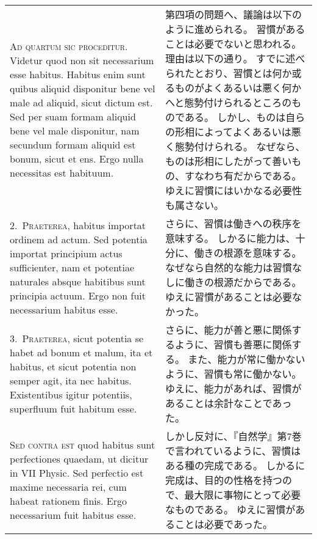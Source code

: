 \documentclass[10pt]{jsarticle} %
\begin{document}
\begin{longtable}{p{21em}p{21em}}
{\scshape Ad quartum sic proceditur}. Videtur quod non sit necessarium esse
 habitus. Habitus enim sunt quibus aliquid disponitur bene vel male ad
 aliquid, sicut dictum est. Sed per suam formam aliquid bene vel male
 disponitur, nam secundum formam aliquid est bonum, sicut et ens. Ergo
 nulla necessitas est habituum.

&

第四項の問題へ、議論は以下のように進められる。
習慣があることは必要でないと思われる。理由は以下の通り。
すでに述べられたとおり、習慣とは何か或るものがよくあるいは悪く何かへと態勢付けられるところのものである。
しかし、ものは自らの形相によってよくあるいは悪く態勢付けられる。
なぜなら、ものは形相にしたがって善いもの、すなわち有だからである。
ゆえに習慣にはいかなる必要性も属さない。

\\



2.~{\scshape Praeterea}, habitus importat ordinem ad actum. Sed potentia importat
 principium actus sufficienter, nam et potentiae naturales absque
 habitibus sunt principia actuum. Ergo non fuit necessarium habitus
 esse.

&

さらに、習慣は働きへの秩序を意味する。
しかるに能力は、十分に、働きの根源を意味する。
なぜなら自然的な能力は習慣なしに働きの根源だからである。
ゆえに習慣があることは必要なかった。

\\



3.~{\scshape Praeterea}, sicut potentia se habet ad bonum et malum, ita et habitus,
 et sicut potentia non semper agit, ita nec habitus. Existentibus
 igitur potentiis, superfluum fuit habitum esse.

&

さらに、能力が善と悪に関係するように、習慣も善悪に関係する。
また、能力が常に働かないように、習慣も常に働かない。
ゆえに、能力があれば、習慣があることは余計なことであった。

\\



{\scshape Sed contra est} quod habitus sunt perfectiones quaedam, ut dicitur in
 VII Physic. Sed perfectio est maxime necessaria rei, cum habeat
 rationem finis. Ergo necessarium fuit habitus esse.

&

しかし反対に、『自然学』第7巻で言われているように、習慣はある種の完成である。
しかるに完成は、目的の性格を持つので、最大限に事物にとって必要なものである。
ゆえに習慣があることは必要であった。


\end{longtable}
\end{document}
